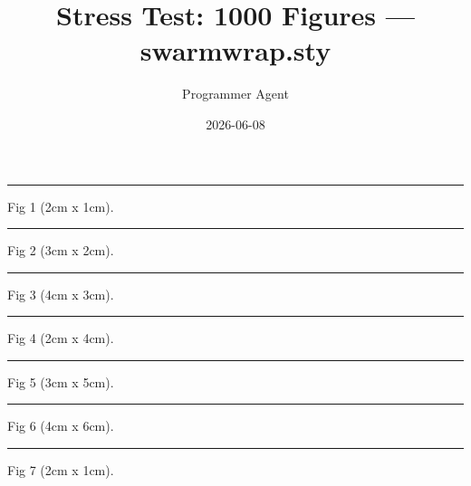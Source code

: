\documentclass[a4paper,11pt]{article}
\title{Stress Test: 1000 Figures — swarmwrap.sty}
\author{Programmer Agent}
\date{2026-06-08}
\begin{document}
\maketitle

\begin{swarmwrap}%
  \begin{minipage}[t]{2cm}
    \centering
    \rule{\linewidth}{1cm}
    {\footnotesize Fig 1 (2cm x 1cm).}
  \end{minipage}%
\end{swarmwrap}%
\swarmwrapnext
\lipsum[1]%

\begin{swarmwrap}%
  \begin{minipage}[t]{3cm}
    \centering
    \rule{\linewidth}{2cm}
    {\footnotesize Fig 2 (3cm x 2cm).}
  \end{minipage}%
\end{swarmwrap}%
\swarmwrapnext
\lipsum[2]%

\begin{swarmwrap}%
  \begin{minipage}[t]{4cm}
    \centering
    \rule{\linewidth}{3cm}
    {\footnotesize Fig 3 (4cm x 3cm).}
  \end{minipage}%
\end{swarmwrap}%
\swarmwrapnext
\lipsum[3]%

\begin{swarmwrap}%
  \begin{minipage}[t]{2cm}
    \centering
    \rule{\linewidth}{4cm}
    {\footnotesize Fig 4 (2cm x 4cm).}
  \end{minipage}%
\end{swarmwrap}%
\swarmwrapnext
\lipsum[4]%

\begin{swarmwrap}%
  \begin{minipage}[t]{3cm}
    \centering
    \rule{\linewidth}{5cm}
    {\footnotesize Fig 5 (3cm x 5cm).}
  \end{minipage}%
\end{swarmwrap}%
\swarmwrapnext
\lipsum[5]%

\begin{swarmwrap}%
  \begin{minipage}[t]{4cm}
    \centering
    \rule{\linewidth}{6cm}
    {\footnotesize Fig 6 (4cm x 6cm).}
  \end{minipage}%
\end{swarmwrap}%
\swarmwrapnext
\lipsum[6]%

\begin{swarmwrap}%
  \begin{minipage}[t]{2cm}
    \centering
    \rule{\linewidth}{1cm}
    {\footnotesize Fig 7 (2cm x 1cm).}
  \end{minipage}%
\end{swarmwrap}%
\swarmwrapnext
\lipsum[7]%
\end{document}
